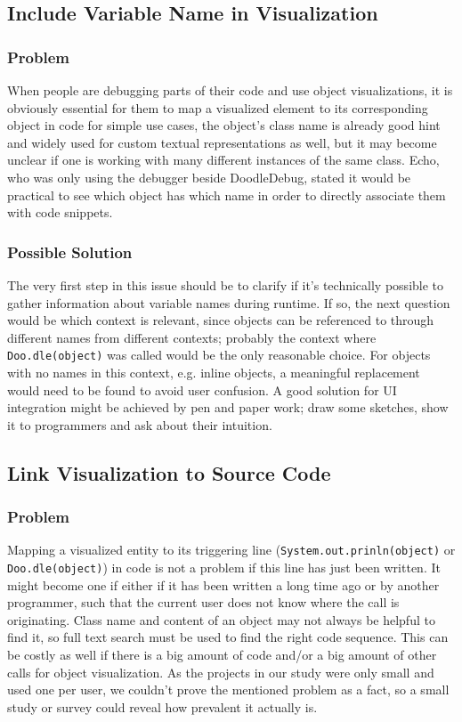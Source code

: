 \documentclass{acm_proc_article-sp}
\begin{document}
\subsection{Include Variable Name in Visualization}

\subsubsection{Problem} When people are debugging parts of their code and use object visualizations, it is obviously essential for them to map a visualized element to its corresponding object in code for simple use cases, the object's class name is already good hint and widely used for custom textual representations as well\cite{dd-study}, but it may become unclear if one is working with many different instances of the same class. Echo, who was only using the debugger beside DoodleDebug, stated it would be practical to see which object has which name in order to directly associate them with code snippets.

\subsubsection{Possible Solution}
The very first step in this issue should be to clarify if it's technically possible to gather information about variable names during runtime. If so, the next question would be which context is relevant, since objects can be referenced to through different names from different contexts; probably the context where \verb-Doo.dle(object)- was called would be the only reasonable choice. For objects with no names in this context, e.g. inline objects, a meaningful replacement would need to be found to avoid user confusion. A good solution for UI integration might be achieved by pen and paper work; draw some sketches, show it to programmers and ask about their intuition.

\subsection{Link Visualization to Source Code}
\subsubsection{Problem}
Mapping a visualized entity to its triggering line (\verb-System.out.prinln(object)- or \verb-Doo.dle(object)-) in code is not a problem if this line has just been written. It might become one if either if it has been written a long time ago or by another programmer, such that the current user does not know where the call is originating. Class name and content of an object may not always be helpful to find it, so full text search must be used to find the right code sequence. This can be costly as well if there is a big amount of code and/or a big amount of other calls for object visualization. As the projects in our study were only small and used one per user, we couldn't prove the mentioned problem as a fact, so a small study or survey could reveal how prevalent it actually is.
\end{document}
